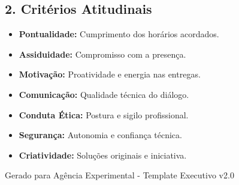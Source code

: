 \documentclass[a4paper,11pt]{article}
\begin{document}
\vspace{0.3cm}

\begin{tcolorbox}[executivecard]
    \section{2. Critérios Atitudinais}
    
    \begin{minipage}[t]{0.48\textwidth}
        \scriptsize {}
        \begin{itemize}[leftmargin=*, label=\color{DeepNavy}\tiny$\blacksquare$]
            \item \textbf{Pontualidade:} Cumprimento dos horários acordados.
            \item \textbf{Assiduidade:} Compromisso com a presença.
            \item \textbf{Motivação:} Proatividade e energia nas entregas.
            \item \textbf{Comunicação:} Qualidade técnica do diálogo.
        \end{itemize}
    \end{minipage}
    \hfill
    \begin{minipage}[t]{0.48\textwidth}
        \scriptsize {}
        \begin{itemize}[leftmargin=*, label=\color{DeepNavy}\tiny$\blacksquare$]
            \item \textbf{Conduta Ética:} Postura e sigilo profissional.
            \item \textbf{Segurança:} Autonomia e confiança técnica.
            \item \textbf{Criatividade:} Soluções originais e iniciativa.
        \end{itemize}
    \end{minipage}
\end{tcolorbox}

\vfill
\begin{center}
    \tiny \color{Graphite!50} Gerado para Agência Experimental - Template Executivo v2.0
\end{center}
\end{document}
